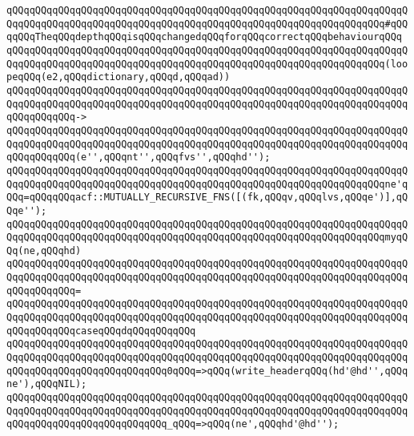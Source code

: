 \newline
\verb|qQQqqQQqqQQqqQQqqQQqqQQqqQQqqQQqqQQqqQQqqQQqqQQqqQQqqQQqqQQqqQQqqQQqqQQqqQQqqQQqqQQqqQQqqQQqqQQqqQQqqQQqqQQqqQQqqQQqqQQqqQQqqQQqqQQqqQQq#qQQqqQQqTheqQQqdepthqQQqisqQQqchangedqQQqforqQQqcorrectqQQqbehaviourqQQq|\newline
\newline
\verb|qQQqqQQqqQQqqQQqqQQqqQQqqQQqqQQqqQQqqQQqqQQqqQQqqQQqqQQqqQQqqQQqqQQqqQQqqQQqqQQqqQQqqQQqqQQqqQQqqQQqqQQqqQQqqQQqqQQqqQQqqQQqqQQqqQQqqQQq(loopeqQQq(e2,qQQqdictionary,qQQqd,qQQqad))|\newline
\verb|qQQqqQQqqQQqqQQqqQQqqQQqqQQqqQQqqQQqqQQqqQQqqQQqqQQqqQQqqQQqqQQqqQQqqQQqqQQqqQQqqQQqqQQqqQQqqQQqqQQqqQQqqQQqqQQqqQQqqQQqqQQqqQQqqQQqqQQqqQQqqQQqqQQqqQQq->|\newline
\verb|qQQqqQQqqQQqqQQqqQQqqQQqqQQqqQQqqQQqqQQqqQQqqQQqqQQqqQQqqQQqqQQqqQQqqQQqqQQqqQQqqQQqqQQqqQQqqQQqqQQqqQQqqQQqqQQqqQQqqQQqqQQqqQQqqQQqqQQqqQQqqQQqqQQqqQQq(e'',qQQqnt'',qQQqfvs'',qQQqhd'');|\newline
\newline
\verb|qQQqqQQqqQQqqQQqqQQqqQQqqQQqqQQqqQQqqQQqqQQqqQQqqQQqqQQqqQQqqQQqqQQqqQQqqQQqqQQqqQQqqQQqqQQqqQQqqQQqqQQqqQQqqQQqqQQqqQQqqQQqqQQqqQQqqQQqne'qQQq=qQQqqQQqacf::MUTUALLY_RECURSIVE_FNS([(fk,qQQqv,qQQqlvs,qQQqe')],qQQqe'');|\newline
\newline
\verb|qQQqqQQqqQQqqQQqqQQqqQQqqQQqqQQqqQQqqQQqqQQqqQQqqQQqqQQqqQQqqQQqqQQqqQQqqQQqqQQqqQQqqQQqqQQqqQQqqQQqqQQqqQQqqQQqqQQqqQQqqQQqqQQqqQQqqQQqmyqQQq(ne,qQQqhd)|\newline
\verb|qQQqqQQqqQQqqQQqqQQqqQQqqQQqqQQqqQQqqQQqqQQqqQQqqQQqqQQqqQQqqQQqqQQqqQQqqQQqqQQqqQQqqQQqqQQqqQQqqQQqqQQqqQQqqQQqqQQqqQQqqQQqqQQqqQQqqQQqqQQqqQQqqQQqqQQq=|\newline
\verb|qQQqqQQqqQQqqQQqqQQqqQQqqQQqqQQqqQQqqQQqqQQqqQQqqQQqqQQqqQQqqQQqqQQqqQQqqQQqqQQqqQQqqQQqqQQqqQQqqQQqqQQqqQQqqQQqqQQqqQQqqQQqqQQqqQQqqQQqqQQqqQQqqQQqqQQqcaseqQQqdqQQqqQQqqQQq|\newline
\verb|qQQqqQQqqQQqqQQqqQQqqQQqqQQqqQQqqQQqqQQqqQQqqQQqqQQqqQQqqQQqqQQqqQQqqQQqqQQqqQQqqQQqqQQqqQQqqQQqqQQqqQQqqQQqqQQqqQQqqQQqqQQqqQQqqQQqqQQqqQQqqQQqqQQqqQQqqQQqqQQqqQQqqQQq0qQQq=>qQQq(write_headerqQQq(hd'@hd'',qQQqne'),qQQqNIL);|\newline
\verb|qQQqqQQqqQQqqQQqqQQqqQQqqQQqqQQqqQQqqQQqqQQqqQQqqQQqqQQqqQQqqQQqqQQqqQQqqQQqqQQqqQQqqQQqqQQqqQQqqQQqqQQqqQQqqQQqqQQqqQQqqQQqqQQqqQQqqQQqqQQqqQQqqQQqqQQqqQQqqQQqqQQqqQQq_qQQq=>qQQq(ne',qQQqhd'@hd'');|\newline
